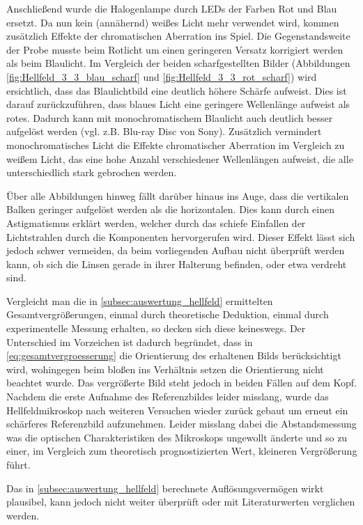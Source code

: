 \documentclass[english, ngerman]{scrartcl}
\begin{document}
Anschließend wurde die Halogenlampe durch LEDs der Farben Rot und Blau ersetzt. Da nun kein (annähernd) weißes Licht mehr verwendet wird, kommen zusätzlich Effekte der chromatischen Aberration ins Spiel. Die Gegenstandsweite der Probe musste beim Rotlicht um einen geringeren Versatz korrigiert werden als beim Blaulicht. Im Vergleich der beiden scharfgestellten Bilder (Abbildungen \ref{fig:Hellfeld_3_3_blau_scharf} und \ref{fig:Hellfeld_3_3_rot_scharf}) wird ersichtlich, dass das Blaulichtbild eine deutlich höhere Schärfe aufweist. Dies ist darauf zurückzuführen, dass blaues Licht eine geringere Wellenlänge aufweist als rotes. Dadurch kann mit monochromatischem Blaulicht auch deutlich besser aufgelöst werden (vgl. z.B. Blu-ray Disc von Sony). Zusätzlich vermindert monochromatisches Licht die Effekte chromatischer Aberration im Vergleich zu weißem Licht, das eine hohe Anzahl verschiedener Wellenlängen aufweist, die alle unterschiedlich stark gebrochen werden.

Über alle Abbildungen hinweg fällt darüber hinaus ins Auge, dass die vertikalen Balken geringer aufgelöst werden als
die horizontalen. Dies kann durch einen Astigmatismus erklärt werden, welcher durch das schiefe Einfallen der Lichtstrahlen durch die Komponenten hervorgerufen wird. Dieser Effekt lässt sich jedoch schwer vermeiden, da beim vorliegenden Aufbau nicht überprüft werden kann, ob sich die Linsen gerade in ihrer Halterung befinden, oder etwa verdreht sind.

Vergleicht man die in \autoref{subsec:auswertung_hellfeld} ermittelten Gesamtvergrößerungen, einmal durch theoretische Deduktion, einmal durch experimentelle Messung erhalten, so decken sich diese keineswegs. Der Unterschied im Vorzeichen ist dadurch begründet, dass in \autoref{eq:gesamtvergroesserung} die Orientierung des erhaltenen Bilds berücksichtigt wird, wohingegen beim bloßen ins Verhältnis setzen die Orientierung nicht beachtet wurde. Das vergrößerte Bild steht jedoch in beiden Fällen auf dem Kopf.
Nachdem die erste Aufnahme des Referenzbildes leider misslang, wurde das Hellfeldmikroskop nach weiteren Versuchen wieder zurück gebaut um erneut ein schärferes Referenzbild aufzunehmen. Leider misslang dabei die Abstandsmessung was die optischen Charakteristiken des Mikroskops ungewollt änderte und so zu einer, im Vergleich zum theoretisch prognostizierten Wert, kleineren Vergrößerung führt.  

Das in \autoref{subsec:auswertung_hellfeld} berechnete Auflösungsvermögen wirkt plausibel, kann jedoch nicht weiter überprüft oder mit Literaturwerten verglichen werden.
\end{document}
